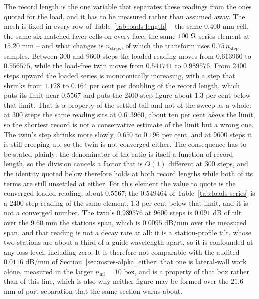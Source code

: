 The record length is the one variable that separates these readings from the ones quoted for the load, and it has
to be measured rather than assumed away. The mesh is fixed in every row of Table~\ref{tab:loads-length} -- the
same $0.400$ mm cell, the same six matched-layer cells on every face, the same $100\ \Omega$ series element at
$15.20$ mm -- and what changes is $n_{\mathrm{steps}}$, of which the transform uses $0.75\,n_{\mathrm{steps}}$
samples. Between $300$ and $9600$ steps the loaded reading moves from $0.613960$ to $0.556575$, while the
load-free twin moves from $0.541741$ to $0.989576$. From $2400$ steps upward the loaded series is monotonically
increasing, with a step that shrinks from $1.128$ to $0.164$ per cent per doubling of the record length, which
puts its limit near $0.5567$ and puts the $2400$-step figure about $1.3$ per cent below that limit. That is a property of the settled tail and not of the sweep as a whole: at $300$ steps the same reading sits at $0.613960$, about ten per cent \emph{above} the limit, so the shortest record is not a conservative estimate of the limit but a wrong one. The twin's
step shrinks more slowly, $0.650$ to $0.196$ per cent, and at $9600$ steps it is still creeping up, so the twin is
not converged either. The consequence has to be stated plainly: the denominator of the ratio is itself a function
of record length, so the division cancels a factor that is $O(1)$ different at $300$ steps, and the identity
quoted below therefore holds at both record lengths while both of its terms are still unsettled at either. For this
element the value to quote is
the converged loaded reading, about $0.5567$; the $0.549464$ of Table~\ref{tab:loads-series} is a $2400$-step
reading of the same element, $1.3$ per cent below that limit, and it is not a converged number. The twin's
$0.989576$ at $9600$ steps is $0.091$ dB of tilt over the $9.60$ mm the stations span, which is $0.0095$ dB/mm
over the measured span, and that reading is not a decay rate at all: it is a station-profile tilt, whose two
stations are about a third of a guide wavelength apart, so it is confounded at any loss level, including zero.
It is
therefore not comparable with the audited $0.0116$ dB/mm of Section~\ref{sec:msres-alpha} either: that one is
lateral-wall work alone, measured in the larger $n_{\mathrm{ml}} = 10$ box, and is a property of that box rather
than of this line, which is also why neither figure may be formed over the $21.6$ mm of port separation that the
same section warns about.

